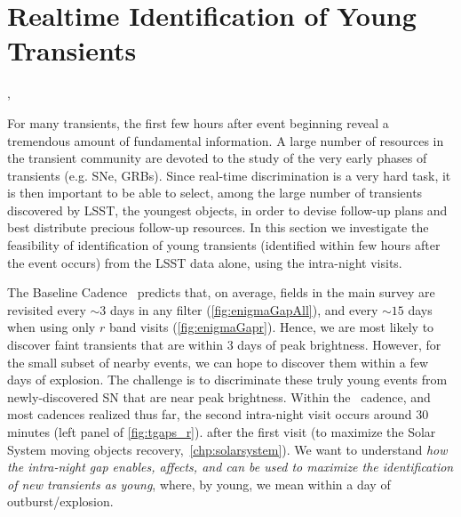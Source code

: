 
%
%
%
%
%
%
%
%

\section{Realtime Identification of Young Transients}
\def\secname{\chpname:transientsAge}\label{sec:\secname}


,  %

For many transients, the first few hours after event beginning reveal a tremendous amount of fundamental information. A large number of resources in the transient community are devoted to the study of the very early phases of transients (e.g. SNe, GRBs). Since real-time discrimination is a very hard task, it is then important to be able to select, among the large number of transients discovered by LSST, the youngest objects, in order to devise follow-up plans and best distribute precious follow-up resources. In this section we investigate the feasibility of identification of young transients (identified within few hours after the event occurs) from the LSST data alone, using the intra-night visits.

The Baseline Cadence~ predicts that, on average,
fields in the main survey are revisited every $\sim3$ days in any filter
(\autoref{fig:enigmaGapAll}), and every $\sim15$ days when using only
$r$ band visits (\autoref{fig:enigmaGapr}).  Hence, we are most likely
to discover faint transients that are within 3 days of peak brightness.
However, for the small subset of nearby events, we can hope to discover
them within a few days of explosion.  The challenge is to discriminate
these truly young events from newly-discovered SN that are near peak
brightness.
Within the~ cadence, and most cadences
realized thus far, the second intra-night visit occurs around 30 minutes (left panel of \autoref{fig:tgaps_r}).
after the first visit (to maximize the Solar System moving objects recovery,~\autoref{chp:solarsystem}). We want to understand {\emph{how the intra-night gap enables, affects, and can be used to maximize the identification of new transients as young}}, where, by young, we mean within a day of outburst/explosion.

